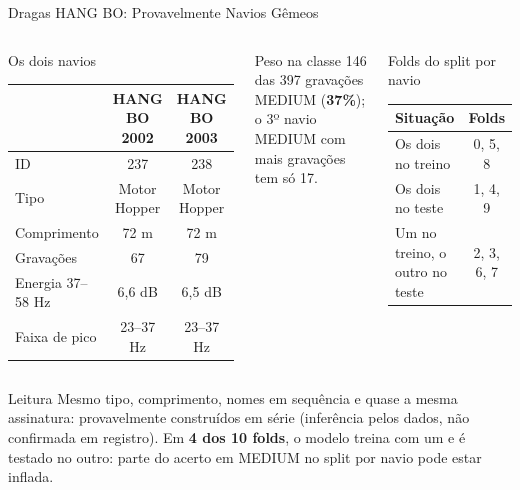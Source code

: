 \documentclass[aspectratio=169]{beamer}
\newcommand{\calo}[1]{\cellcolor{red!20}#1}
\begin{document}
\begin{frame}{Dragas HANG BO: Provavelmente Navios Gêmeos}
    \footnotesize
    \begin{columns}[t]
        \begin{block}{\small Os dois navios}
            \tiny
            \centering
            \setlength{\tabcolsep}{3pt}
            \begin{tabular}{lcc}
            \toprule
             & HANG BO 2002 & HANG BO 2003 \\
            \midrule
            ID & 237 & 238 \\
            Tipo & Motor Hopper & Motor Hopper \\
            Comprimento & 72 m & 72 m \\
            Gravações & 67 & 79 \\
            Energia 37--58 Hz & 6,6 dB & 6,5 dB \\
            Faixa de pico & 23--37 Hz & 23--37 Hz \\
            \bottomrule
            \end{tabular}
        \end{block}
        \begin{block}{\small Peso na classe}
            \scriptsize
            146 das 397 gravações MEDIUM (\textbf{37\%}); o 3º navio MEDIUM com mais gravações tem só 17.
        \end{block}
        \begin{block}{\small Folds do split por navio}
            \tiny
            \centering
            \begin{tabular}{lc}
            \toprule
            Situação & Folds \\
            \midrule
            Os dois no treino & 0, 5, 8 \\
            Os dois no teste & 1, 4, 9 \\
            \calo{Um no treino, o outro no teste} & \calo{2, 3, 6, 7} \\
            \bottomrule
            \end{tabular}
        \end{block}
    \end{columns}
    \vspace{0.05cm}
    \begin{alertblock}{Leitura}
        \scriptsize
        Mesmo tipo, comprimento, nomes em sequência e quase a mesma assinatura: provavelmente construídos em série (inferência pelos dados, não confirmada em registro). Em \textbf{4 dos 10 folds}, o modelo treina com um e é testado no outro: parte do acerto em MEDIUM no split por navio pode estar inflada.
    \end{alertblock}
\end{frame}
\end{document}
